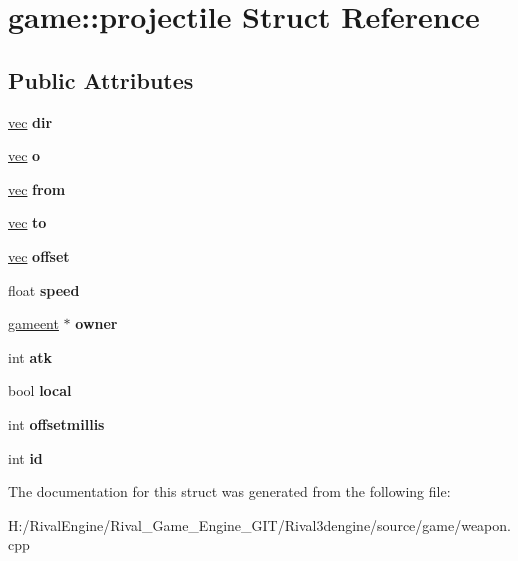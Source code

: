 \hypertarget{structgame_1_1projectile}{}\section{game\+:\+:projectile Struct Reference}
\label{structgame_1_1projectile}
\subsection*{Public Attributes}
\begin{DoxyCompactItemize}
\item 
\mbox{\label{structgame_1_1projectile_a7a5d26de50462aa29efec48c55354e38}} 
\hyperlink{structvec}{vec} {\bfseries dir}
\item 
\mbox{\label{structgame_1_1projectile_a89deb1278c1d365263351538b0e127c5}} 
\hyperlink{structvec}{vec} {\bfseries o}
\item 
\mbox{\label{structgame_1_1projectile_ab1095cf31004f26ac78b0bfc273c6ddd}} 
\hyperlink{structvec}{vec} {\bfseries from}
\item 
\mbox{\label{structgame_1_1projectile_aa07e49fc50f938cdb379bbd13aa3dd8f}} 
\hyperlink{structvec}{vec} {\bfseries to}
\item 
\mbox{\label{structgame_1_1projectile_a1ddfab52254f46f7413a02da052ac297}} 
\hyperlink{structvec}{vec} {\bfseries offset}
\item 
\mbox{\label{structgame_1_1projectile_a8f2c1ee333abdb8e9efc49038cb5d7a4}} 
float {\bfseries speed}
\item 
\mbox{\label{structgame_1_1projectile_a9551cad5a9cb90243bc5db6cbcf47f5b}} 
\hyperlink{structgameent}{gameent} $\ast$ {\bfseries owner}
\item 
\mbox{\label{structgame_1_1projectile_aa36960a4cf4e15238167b769b854646a}} 
int {\bfseries atk}
\item 
\mbox{\label{structgame_1_1projectile_aca06396485a444f23cf33ac18fc35c18}} 
bool {\bfseries local}
\item 
\mbox{\label{structgame_1_1projectile_add64c1050493bb74a5c6084dd86722bb}} 
int {\bfseries offsetmillis}
\item 
\mbox{\label{structgame_1_1projectile_ad3011af74490f055b54219f254940493}} 
int {\bfseries id}
\end{DoxyCompactItemize}


The documentation for this struct was generated from the following file\+:\begin{DoxyCompactItemize}
\item 
H\+:/\+Rival\+Engine/\+Rival\+\_\+\+Game\+\_\+\+Engine\+\_\+\+G\+I\+T/\+Rival3dengine/source/game/weapon.\+cpp\end{DoxyCompactItemize}
